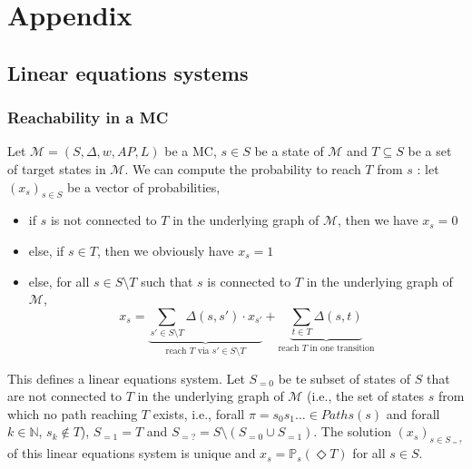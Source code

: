 \chapter*{Appendix}

\section{Linear equations systems}
\subsection{Reachability in a MC}\label{app-reach}
Let $\mathcal{M} = (S, \Delta, w, AP, L)$ be a MC, $s \in S$ be a state of $\mathcal{M}$ and $T \subseteq S$ be a set of target states in $\mathcal{M}$.
We can compute the probability to reach $T$ from $s$ :
let $(x_s)_{s \in S}$ be a vector of probabilities,
\begin{itemize}
	\item if $s$ is not connected to $T$ in the underlying graph of $\mathcal{M}$, then we have $x_s = 0$
	\item else, if $s \in T$, then we obviously have $x_s = 1$
	\item else, for all $s \in S \setminus T$  such that $s$ is connected to $T$ in the underlying graph of $\mathcal{M}$,
		\[
      x_s = \underbrace{\sum_{s' \in S \setminus T} \Delta(s, s') \cdot x_{s'}}_{\text{reach $T$ via $s' \in S \setminus T$}} + \underbrace{\sum_{t \in T} \Delta(s, t)}_{\text{reach $T$ in one transition}}
    \]
\end{itemize}
This defines a linear equations system.
Let $S_{=0}$ be te subset of states of $S$ that are not connected to $T$ in the underlying graph of $\mathcal{M}$ (i.e., the set of states $s$ from which no path reaching $T$ exists, i.e., forall $\pi = s_0s_1\dots \in Paths(s)$ and forall $k \in \mathbb{N}$, $s_k \not\in T$), $S_{=1} = T$ and $S_{=?} = S \setminus (S_{=0} \cup S_{=1})$.
The solution $(x_s)_{s \in S_{=?}}$ of this linear equations system is unique and $x_s = \mathbb{P}_s(\Diamond T)$ for all $s \in S$.


